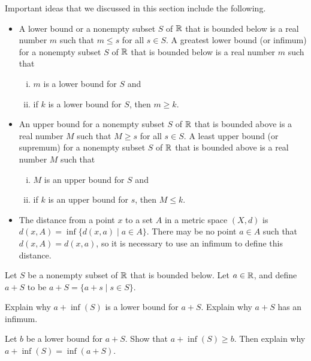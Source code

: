 \label{sec_glb_summ}
Important ideas that we discussed in this section include the following.
\begin{itemize}

\item  A lower bound or a nonempty subset $S$ of $\mathbb{R}$ that is bounded below is a real number $m$ such that $m \leq s$ for all $s \in S$. A greatest lower bound (or infimum) for a nonempty subset $S$ of $\mathbb{R}$ that is bounded below is a real number $m$ such that 
\begin{enumerate}[i.]
\item $m$ is a lower bound for $S$ and
\item if $k$ is a lower bound for $S$, then $m \geq k$. 
\end{enumerate}
\item An upper bound for a nonempty subset $S$ of $\mathbb{R}$ that is bounded above is a real number $M$ such that $M \geq s$ for all $s \in S$. A least upper bound (or supremum) for a nonempty subset $S$ of $\mathbb{R}$ that is bounded above is a real number $M$ such that 
\begin{enumerate}[i.]
\item $M$ is an upper bound for $S$ and
\item if $k$ is an upper bound for $s$, then $M \leq k$. 
\end{enumerate}

\item The distance from a point $x$ to a set $A$ in a metric space $(X,d)$ is $d(x,A) = \inf \{d(x,a) \mid a \in A\}$. There may be no point $a \in A$ such that $d(x,A) = d(x,a)$, so it is necessary to use an infimum to define this distance.

\end{itemize}

\label{sec_glb_exer}

\be

\item Let $S$ be a nonempty subset of $\mathbb{R}$ that is bounded below. Let $a \in \mathbb{R}$, and define $a+S$ to be $a+S = \{a+s \mid s \in S\}$. 
\ba
	\item Explain why $a+\inf(S)$ is a lower bound for $a+S$. Explain why $a+S$ has an infimum. 
	
 	\item Let $b$ be a lower bound for $a+S$. Show that $a + \inf(S) \geq b$. Then explain why $a+\inf(S) = \inf(a+S)$.   

\ea

